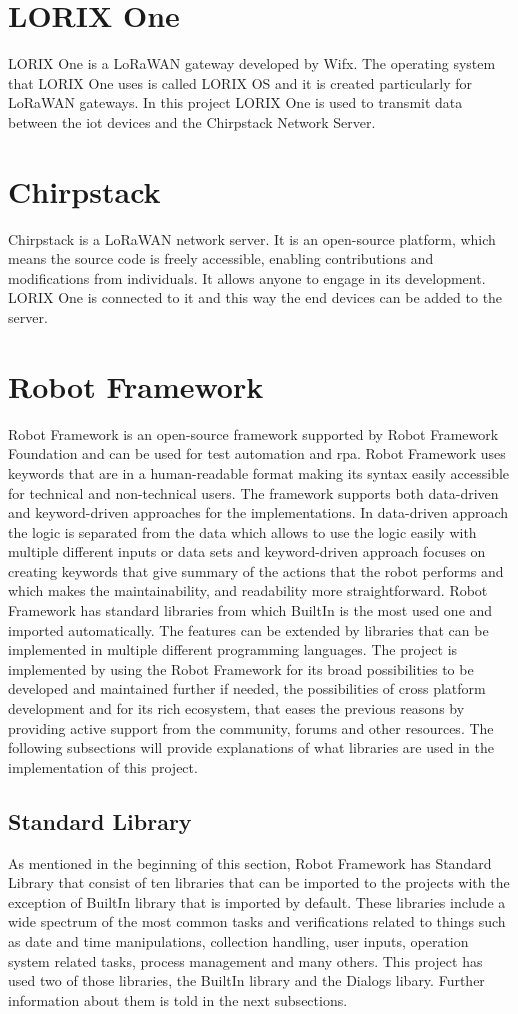 \section{LORIX One}
LORIX One is a LoRaWAN gateway developed by Wifx.
The operating system that LORIX One uses is called LORIX OS and it is created particularly for LoRaWAN gateways.
In this project LORIX One is used to transmit data between the \gls{iot} devices and the Chirpstack Network Server.
\section{Chirpstack}
Chirpstack is a LoRaWAN network server. It is an open-source platform, which means the source code is freely accessible, enabling contributions and modifications from individuals. It allows anyone to engage in its development. LORIX One is connected to it and this way the end devices can be added to the server.
\section{Robot Framework}
Robot Framework is an open-source framework supported by Robot Framework Foundation and can be used for test automation and \gls{rpa}.
Robot Framework uses keywords that are in a human-readable format making its syntax easily accessible for technical and non-technical users.
The framework supports both data-driven and keyword-driven approaches for the implementations.
In data-driven approach the logic is separated from the data which allows to use the logic easily with multiple different inputs or data sets and keyword-driven approach focuses on creating keywords that give summary of the actions that the robot performs and which makes the maintainability, and readability more straightforward.
Robot Framework has standard libraries from which BuiltIn is the most used one and imported automatically.
The features can be extended by libraries that can be implemented in multiple different programming languages.
The project is implemented by using the Robot Framework for its broad possibilities to be developed and maintained further if needed, the possibilities of cross platform development and for its rich ecosystem, that eases the previous reasons by providing active support from the community, forums and other resources.
The following subsections will provide explanations of what libraries are used in the implementation of this project.

\subsection{Standard Library}
As mentioned in the beginning of this section, Robot Framework has Standard Library that consist of ten libraries that can be imported to the projects with the exception of BuiltIn library that is imported by default.
These libraries include a wide spectrum of the most common tasks and verifications related to things such as date and time manipulations, collection handling, user inputs, operation system related tasks, process management and many others.
This project has used two of those libraries, the BuiltIn library and the Dialogs libary.
Further information about them is told in the next subsections.
